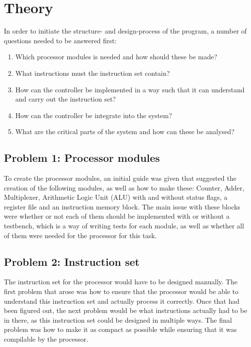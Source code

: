 \documentclass[12pt,a4paper]{article}
\begin{document}
\section{Theory}
 	In order to initiate the structure- and design-process of the program, a number of questions needed to be answered first:\\
 	
 	\begin{enumerate}
	\item Which processor modules is needed and how should these be made?
	\item What instructions must the instruction set contain?
	\item How can the controller be implemented in a way such that it can understand and carry out the instruction set?
	\item How can the controller be integrate into the system?
	\item What are the critical parts of the system and how can these be analysed?
\end{enumerate}

\subsection{Problem 1: Processor modules}
	To create the processor modules, an initial guide was given that suggested the creation of the following modules, as well as how to make these: Counter, Adder, Multiplexer, Arithmetic Logic Unit (ALU) with and without status flags, a register file and an instruction memory block. The main issue with these blocks were whether or not each of them should be implemented with or without a testbench, which is a way of writing tests for each module, as well as whether all of them were needed for the processor for this task.\\
\subsection{Problem 2: Instruction set}
	The instruction set for the processor would have to be designed manually. The first problem that arose was how to ensure that the processor would be able to understand this instruction set and actually process it correctly. Once that had been figured out, the next problem would be what instructions actually had to be in there, as this instruction set could be designed in multiple ways. The final problem was how to make it as compact as possible while ensuring that it was compilable by the processor.\\
	
\end{document}
